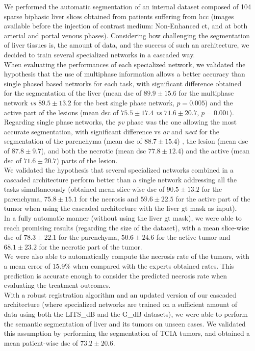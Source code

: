 We performed the automatic segmentation of an internal dataset composed
of 104 sparse biphasic liver slices obtained from patients suffering
from \ac{hcc} (images available before the injection of contrast medium:
Non-Enhanced \ac{ct}, and at both arterial and portal venous phases).
Considering how challenging the segmentation of liver tissues is, the
amount of data, and the success of such an architecture, we decided to
train several specialized networks in a cascaded way.\\
When evaluating the performances of each specialized network, we
validated the hypothesis that the use of multiphase information allows a
better accuracy than single phased based networks for each task,
with significant difference obtained for the segmentation of the liver
(mean \ac{dsc} of $ 89.9 \pm 15.6 $ for the multiphase network \emph{vs} $ 89.5 \pm 13.2 $ for the best single phase network, $p = 0.005$) and the active part of the lesions (mean \ac{dsc} of $ 75.5 \pm 17.4 $ \emph{vs} $ 71.6 \pm 20.7 $, $p = 0.001$).\\
Regarding single phase networks, the \emph{\ac{pv}} phase was the one
allowing the most accurate segmentation, with significant difference vs
\emph{\ac{ar}} and \emph{\ac{nect}} for the segmentation of the parenchyma (mean \ac{dsc} of $ 88.7 \pm 15.4 $) , the lesion (mean \ac{dsc} of $ 87.8 \pm 9.7 $), and both the
necrotic (mean \ac{dsc} $ 77.8 \pm 12.4 $) and the active (mean \ac{dsc} of $ 71.6 \pm 20.7 $)
parts of the lesion. \\
We validated the hypothesis that several specialized networks combined
in a cascaded architecture perform better than a single network
addressing all the tasks simultaneously (obtained mean slice-wise \ac{dsc} of $ 90.5 \pm 13.2 $ for the parenchyma, $ 75.8 \pm 15.1 $ for the necrosis and $ 59.6 \pm 22.5 $ for the active part of the tumor when using the cascaded architecture with the liver \ac{gt} mask as input).\\
In a fully automatic manner (without using the liver \ac{gt} mask), we were able to reach promising results (regarding the size of the dataset), with a mean slice-wise \ac{dsc} of $ 78.3 \pm 22.1 $ for the parenchyma, $ 50.6 \pm 24.6 $ for the active tumor and $ 68.1 \pm 23.2 $ for the necrotic part of the tumor.\\
We were also able to automatically compute the necrosis rate of the
tumors, with a mean error of 15.9\% when compared with the experts
obtained rates. This prediction is accurate enough to consider the
predicted necrosis rate when evaluating the treatment outcomes. \\
With a robust registration algorithm and an updated version of our cascaded architecture (where specialized networks are trained on a sufficient amount of data using both the LITS\_dB and the G\_dB datasets), we were
able to perform the semantic segmentation of liver and its tumors on
unseen cases.
We validated this assumption by performing the segmentation of TCIA
tumors, and obtained a mean patient-wise \ac{dsc} of $ 73.2 \pm 20.6 $.

